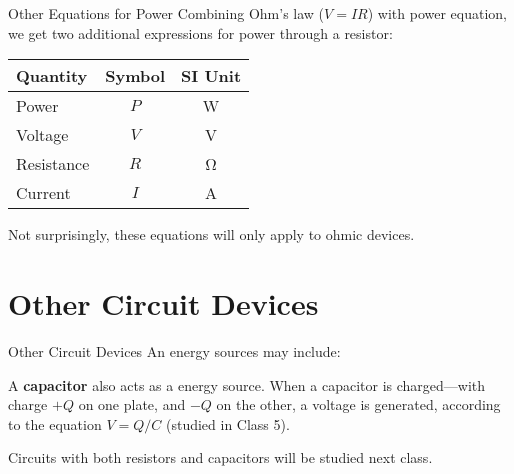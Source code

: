 \documentclass[12pt,aspectratio=169]{beamer}
\begin{document}
\begin{frame}{Other Equations for Power}
  Combining Ohm's law ($V=IR$) with power equation, we get two additional
  expressions for power through a resistor:

  \begin{center}
    \begin{tabular}{l|c|c}
      \rowcolor{pink}
      \textbf{Quantity} & \textbf{Symbol} & \textbf{SI Unit} \\ \hline
      Power      & $P$ & \si\watt \\
      Voltage    & $V$ & \si\volt \\
      Resistance & $R$ & \si\ohm  \\
      Current    & $I$ & \si\ampere
    \end{tabular}
  \end{center}
  Not surprisingly, these equations will only apply to ohmic devices.
\end{frame}


\section{Other Circuit Devices}

\begin{frame}{Other Circuit Devices}
  An energy sources may include:
  \begin{center}
  \end{center}
  A \textbf{capacitor} also acts as a energy source. When a capacitor is
  charged---with charge $+Q$ on one plate, and $-Q$ on the other, a voltage
  is generated, according to the equation $V=Q/C$ (studied in Class 5).
  \begin{center}
  \end{center}
  Circuits with both resistors and capacitors will be studied next class.
\end{frame}
\end{document}
